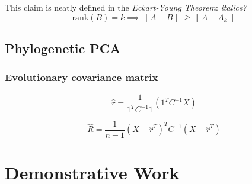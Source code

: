 \documentclass[12pt]{article}
\theoremstyle{definition}
\begin{document}
This claim is neatly defined in the \textit{Eckart-Young Theorem}: 
\textit{italics?}
\begin{equation}
	\mathrm{rank}(B) = k \implies \|A - B\| \ge \|A - A_k\|
	\label{eq:Eckart-Young}
\end{equation}

\subsection{Phylogenetic PCA}

\subsubsection{Evolutionary covariance matrix}






$$
\hat{r} = \frac{1}{\mathrm{1}^T C^{-1} \mathrm{1}} \left( \mathrm{1}^T C^{-1} X \right)
$$


$$
\hat{R} = \frac{1}{n-1} \left( X - \hat{r}^T \right)^T C^{-1} \left( X - \hat{r}^T \right)
$$





\section{Demonstrative Work}
\end{document}

